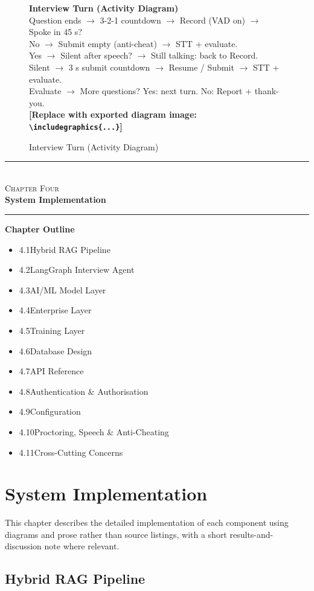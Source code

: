 \documentclass[12pt,a4paper,oneside]{report}
\newcommand{\diagramplaceholder}[1]{%
  \begin{tcolorbox}[
    colback=gray!5, colframe=gray!50,
    boxrule=0.4pt, arc=2pt,
    left=10pt, right=10pt, top=8pt, bottom=8pt,
    fontupper=\small\itshape
  ]
  \centering #1\\[4pt]
  \textbf{[Replace with exported diagram image: \texttt{\textbackslash includegraphics\{...\}}]}
  \end{tcolorbox}%
}
\newcommand{\chapterfrontpage}[3]{%
  \clearpage
  \thispagestyle{empty}
  \vspace*{4cm}
  \begin{center}
    \textcolor{ainshams}{\rule{0.6\linewidth}{1.5pt}}\\[0.6cm]
    {\LARGE\textsc{#1}}\\[0.8cm]
    {\Huge\bfseries #2}\\[0.6cm]
    \textcolor{ainshams}{\rule{0.6\linewidth}{1.5pt}}
  \end{center}
  \vspace{1.8cm}
  \begin{center}
    \begin{minipage}{0.72\linewidth}
      \textbf{\large Chapter Outline}\\[6pt]
      \begin{itemize}[leftmargin=1.4em]
        #3
      \end{itemize}
    \end{minipage}
  \end{center}
  \clearpage
}
\begin{document}
\begin{figure}[H]
\centering
\diagramplaceholder{%
  \textbf{Interview Turn (Activity Diagram)}\\
  Question ends $\to$ 3-2-1 countdown $\to$ Record (VAD on) $\to$ Spoke in 45 s?\\
  No $\to$ Submit empty (anti-cheat) $\to$ STT + evaluate.\\
  Yes $\to$ Silent after speech? $\to$ Still talking: back to Record.\\
  Silent $\to$ 3 s submit countdown $\to$ Resume / Submit $\to$ STT + evaluate.\\
  Evaluate $\to$ More questions? Yes: next turn. No: Report + thank-you.%
}
\caption{Interview Turn (Activity Diagram)}
\label{fig:activity}
\end{figure}

\chapterfrontpage{Chapter Four}{System Implementation}{%
  \item 4.1\quad Hybrid RAG Pipeline
  \item 4.2\quad LangGraph Interview Agent
  \item 4.3\quad AI/ML Model Layer
  \item 4.4\quad Enterprise Layer
  \item 4.5\quad Training Layer
  \item 4.6\quad Database Design
  \item 4.7\quad API Reference
  \item 4.8\quad Authentication \& Authorisation
  \item 4.9\quad Configuration
  \item 4.10\quad Proctoring, Speech \& Anti-Cheating
  \item 4.11\quad Cross-Cutting Concerns
}

\chapter{System Implementation}
\label{ch:implementation}

This chapter describes the detailed implementation of each component using diagrams and prose
rather than source listings, with a short results-and-discussion note where relevant.

\section{Hybrid RAG Pipeline}
\end{document}
